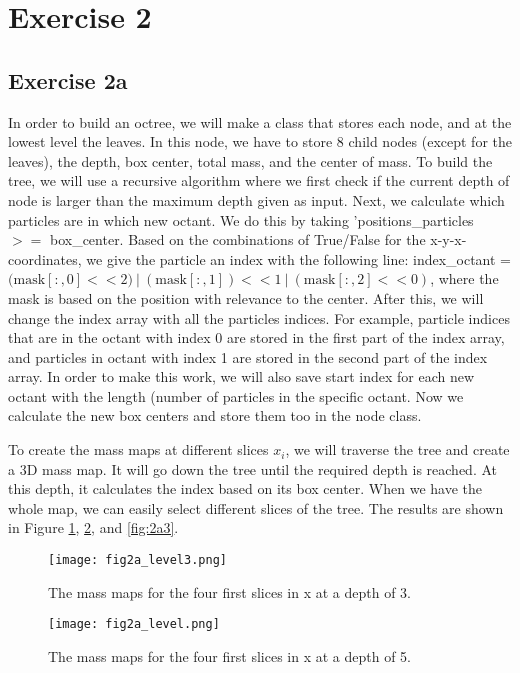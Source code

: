 \section{Exercise 2}

\subsection{Exercise 2a}
In order to build an octree, we will make a class that stores each node, and at the lowest level the leaves. In this node, we have to store 8 child nodes (except for the leaves), the depth, box center, total mass, and the center of mass. To build the tree, we will use a recursive algorithm where we first check if the current depth of node is larger than the maximum depth given as input. Next, we calculate which particles are in which new octant. We do this by taking 'positions\_particles $>=$ box\_center. Based on the combinations of True/False for the x-y-x-coordinates, we give the particle an index with the following line: index\_octant = $(\mathrm{mask[:,0] << 2)\ |\ (mask[:,1]) << 1\ |\ (mask[:,2] << 0)}$, where the mask is based on the position with relevance to the center. After this, we will change the index array with all the particles indices. For example, particle indices that are in the octant with index 0 are stored in the first part of the index array, and particles in octant with index 1 are stored in the second part of the index array. In order to make this work, we will also save start index for each new octant with the length (number of particles in the specific octant. Now we calculate the new box centers and store them too in the node class. 

To create the mass maps at different slices $x_i$, we will traverse the tree and create a 3D mass map. It will go down the tree until the required depth is reached. At this depth, it calculates the index based on its box center. When we have the whole map, we can easily select different slices of the tree. The results are shown in Figure \ref{fig:2a1}, \ref{fig:2a2}, and \ref{fig:2a3}.

\begin{figure}[h!]
  \centering
  \texttt{[image: fig2a\_level3.png]}
  \caption{The mass maps for the four first slices in x at a depth of 3.}
  \label{fig:2a1}
\end{figure}

\begin{figure}[h!]
  \centering
  \texttt{[image: fig2a\_level.png]}
  \caption{The mass maps for the four first slices in x at a depth of 5.}
  \label{fig:2a2}
\end{figure}

